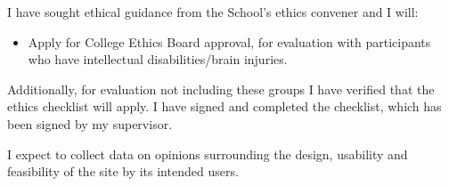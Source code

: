 \documentclass[11pt]{article}
\begin{document}
I have sought ethical guidance from the School's ethics convener and I will: 
    \begin{itemize}
        \item Apply for College Ethics Board approval, for evaluation with participants who have intellectual disabilities/brain injuries.    
    \end{itemize}

Additionally, for evaluation not including these groups I have verified that the ethics checklist will apply. I have signed and completed the checklist, which has been signed by my supervisor. 

I expect to collect data on opinions surrounding the design, usability and feasibility of the site by its intended users. 
\end{document}

